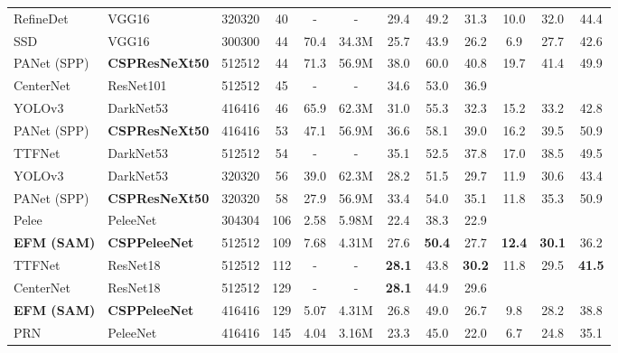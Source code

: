 \documentclass{article}
\begin{document}
\begin{table*}[t]
\begin{threeparttable}[t]
\begin{tabular}{llcccccccccc}
			RefineDet \cite{zhang2018single} & VGG16 \cite{simonyan2014very} & 320320 & 40 & - & - & 29.4 & 49.2 & 31.3 & 10.0 & 32.0 & 44.4 \\	
			SSD \cite{liu2016ssd} & VGG16 \cite{simonyan2014very} & 300300 & 44 & 70.4 & 34.3M & 25.7 & 43.9 & 26.2 & 6.9 & 27.7 & 42.6 \\	
			PANet (SPP) \cite{liu2018path} & \textbf{CSPResNeXt50} & 512512 & 44 & 71.3 & 56.9M & 38.0 & 60.0 & 40.8 & 19.7 & 41.4 & 49.9 \\
			CenterNet \cite{zhou2019objects} & ResNet101 \cite{he2016deep} & 512512 & 45 & - & - & 34.6 & 53.0 & 36.9 &  &  &  \\	
			YOLOv3 \cite{redmon2018yolov3} & DarkNet53 \cite{redmon2018yolov3} & 416416 & 46 & 65.9 & 62.3M & 31.0 & 55.3 & 32.3 & 15.2 & 33.2 & 42.8 \\	
			PANet (SPP) \cite{liu2018path} & \textbf{CSPResNeXt50} & 416416 & 53 & 47.1 & 56.9M & 36.6 & 58.1 & 39.0 & 16.2 & 39.5 & 50.9 \\
			TTFNet \cite{liu2019training} & DarkNet53 \cite{redmon2018yolov3} & 512512 & 54 & - & - & 35.1 & 52.5 & 37.8 & 17.0 & 38.5 & 49.5 \\	
			YOLOv3 \cite{redmon2018yolov3} & DarkNet53 \cite{redmon2018yolov3} & 320320 & 56 & 39.0 & 62.3M & 28.2 & 51.5 & 29.7 & 11.9 & 30.6 & 43.4 \\	
			PANet (SPP) \cite{liu2018path} & \textbf{CSPResNeXt50} & 320320 & 58 & 27.9 & 56.9M & 33.4 & 54.0 & 35.1 & 11.8 & 35.3 & 50.9 \\				
			\midrule
			Pelee \cite{wang2018pelee} & PeleeNet \cite{wang2018pelee} & 304304 & 106 & 2.58 & 5.98M & 22.4 & 38.3 & 22.9 &  &  &  \\
			\textbf{EFM (SAM)} & \textbf{CSPPeleeNet} & 512512 & 109 & 7.68 & 4.31M & 27.6 & \textbf{50.4} & 27.7 & \textbf{12.4} & \textbf{30.1} & 36.2 \\
			TTFNet \cite{liu2019training} & ResNet18 \cite{he2016deep} & 512512 & 112 & - & - & \textbf{28.1} & 43.8 & \textbf{30.2} & 11.8 & 29.5 & \textbf{41.5} \\
			CenterNet \cite{zhou2019objects} & ResNet18 \cite{he2016deep} & 512512 & 129 & - & - & \textbf{28.1} & 44.9 & 29.6 &  &  &  \\
			\textbf{EFM (SAM)} & \textbf{CSPPeleeNet} & 416416 & 129 & 5.07 & 4.31M & 26.8 & 49.0 & 26.7 & 9.8 & 28.2 & 38.8 \\
			PRN \cite{wang2019enriching} & PeleeNet \cite{wang2018pelee} & 416416 & 145 & 4.04 & 3.16M & 23.3 & 45.0 & 22.0 & 6.7 & 24.8 & 35.1 \\

\end{tabular}
\end{threeparttable}
\end{table*}
\end{document}
